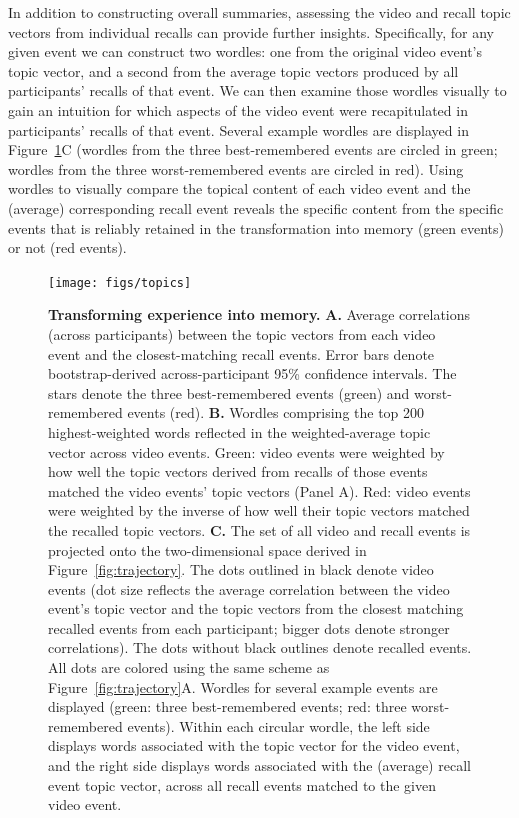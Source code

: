 \documentclass{article}
\begin{document}
In addition to constructing overall summaries, assessing the video and recall topic vectors from individual recalls can provide further insights.  Specifically, for any given event we can construct two wordles: one from the original video event's topic vector, and a second from the average topic vectors produced by all participants' recalls of that event.  We can then examine those wordles visually to gain an intuition for which aspects of the video event were recapitulated in participants' recalls of that event.  Several example wordles are displayed in Figure~\ref{fig:topics}C (wordles from the three best-remembered events are circled in green; wordles from the three worst-remembered events are circled in red).  Using wordles to visually compare the topical content of each video event and the (average) corresponding recall event reveals the specific content from the specific events that is reliably retained in the transformation into memory (green events) or not (red events).

\begin{figure}[tp]
\centering
\texttt{[image: figs/topics]}
\caption{\small \textbf{Transforming experience into memory.} \textbf{A.} Average correlations (across participants) between the topic vectors from each video event and the closest-matching recall events.  Error bars denote bootstrap-derived across-participant 95\% confidence intervals.  The stars denote the three best-remembered events (green) and worst-remembered events (red).  \textbf{B.} Wordles comprising the top 200 highest-weighted words reflected in the weighted-average topic vector across video events.  Green: video events were weighted by how well the topic vectors derived from recalls of those events matched the video events' topic vectors (Panel A).  Red: video events were weighted by the inverse of how well their topic vectors matched the recalled topic vectors.  \textbf{C.}  The set of all video and recall events is projected onto the two-dimensional space derived in Figure~\ref{fig:trajectory}.  The dots outlined in black denote video events (dot size reflects the average correlation between the video event's topic vector and the topic vectors from the closest matching recalled events from each participant; bigger dots denote stronger correlations).  The dots without black outlines denote recalled events.  All dots are colored using the same scheme as Figure~\ref{fig:trajectory}A.  Wordles for several example events are displayed (green: three best-remembered events; red: three worst-remembered events).  Within each circular wordle, the left side displays words associated with the topic vector for the video event, and the right side displays words associated with the (average) recall event topic vector, across all recall events matched to the given video event.}
\label{fig:topics}
\end{figure}
\end{document}

